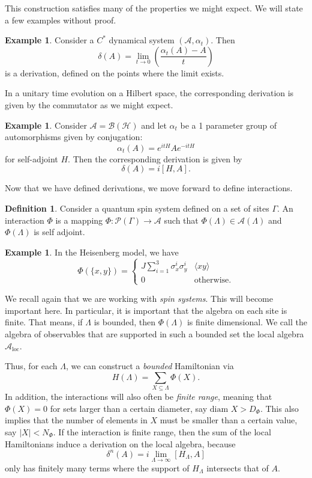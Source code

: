 \documentclass[prb,11pt, nofootinbib]{revtex4-2}
\theoremstyle{definition}
\newtheorem{Example}[Theorem]{Example}
\theoremstyle{definition}
\theoremstyle{definition}
\theoremstyle{definition}
\newtheorem{Definition}[Theorem]{Definition}
\newcommand{\note}[1]{{\color{red} {#1}}}
\renewcommand{\note}[1]{{}}
\begin{document}
This construction satisfies many of the properties we might expect. We will state a few examples without proof.
\begin{Example}
	Consider a $C^*$ dynamical system $(\mathcal{A}, \alpha_t)$. Then
	\[
	\delta(A) = \lim_{t \to 0}\left( \frac{\alpha_t(A) - A}{t} \right)  
\]
is a derivation, defined on the points where the limit exists.\note{ You show the product rule in the same way you show the product rule on an ordinary derivative: 
	\[H'(x) = \lim_{h\to 0}\frac1h\left[f(x+h)g(x+h)-f(x)g(x+h)+f(x)g(x+h)-f(x)g(x)\right]\]}
\end{Example}
In a unitary time evolution on a Hilbert space, the corresponding derivation is given by the commutator as we might expect.
\begin{Example}
	Consider $\mathcal{A}=\mathcal{B}(\mathcal{H})$ and let $\alpha_t$ be a 1 parameter group of automorphisms given by conjugation:
	\[
		\alpha_t(A) = e^{itH}Ae^{-itH}
	\]
	for self-adjoint $H$. Then the corresponding derivation is given by
	\[
		\delta(A) = i[H,A]
	.\] 
\end{Example}
Now that we have defined derivations, we move forward to define interactions. 
\begin{Definition}
	Consider a quantum spin system defined on a set of sites $\Gamma$. An interaction $\Phi$ is a mapping $\Phi: \mathcal{P}(\Gamma)\to \mathcal{A}$ such that $\Phi(\Lambda)\in \mathcal{A}(\Lambda)$ and $\Phi(\Lambda)$ is self adjoint.
\end{Definition}
\begin{Example}
	In the Heisenberg model, we have
	\[
	\Phi(\{x,y\}) = \begin{cases}
		J\sum_{i=1}^3 \sigma_x^i \sigma_y^i & \langle xy\rangle\\
		0 & \text{otherwise.}
	\end{cases}
	\] 
\end{Example}
We recall again that we are working with \emph{spin systems}. This will become important here. In particular, it is important that the algebra on each site is finite. That means, if $\Lambda$ is bounded, then $\Phi(\Lambda)$ is finite dimensional. We call the algebra of observables that are supported in such a bounded set the local algebra $\mathcal{A}_\text{loc}$.

Thus, for each $\Lambda$, we can construct a \emph{bounded} Hamiltonian via
\[
	H(\Lambda) = \sum_{X\subseteq \Lambda}\Phi(X)
.\] 
In addition, the interactions will also often be \emph{finite range}, meaning that $\Phi(X)=0$ for sets larger than a certain diameter, say $\text{diam } X > D_\Phi$. This also implies that the number of elements in $X$ must be smaller than a certain value, say $|X|<N_\Phi$. If the interaction is finite range, then the sum of the local Hamiltonians induce a derivation on the local algebra, because
\[
	\delta^n(A) = i \lim_{\Lambda \to \infty}[H_\Lambda, A]
\]
only has finitely many terms where the support of $H_\Lambda$ intersects that of $A$.\note{ Probably comment something here about how this limit is in the sense of convergence of a net in the sense of the quasi-local algebra.}
\end{document}
